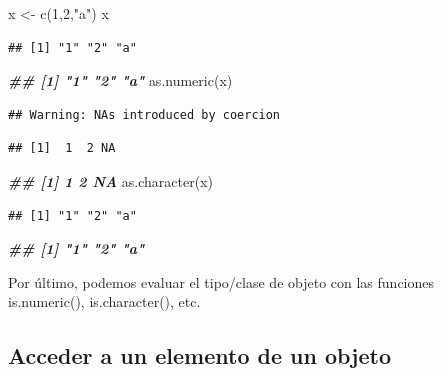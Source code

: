 \documentclass[
]{book}
\newenvironment{Shaded}{\begin{snugshade}}{\end{snugshade}}
\newcommand{\DecValTok}[1]{\textcolor[rgb]{0.00,0.00,0.81}{#1}}
\newcommand{\DocumentationTok}[1]{\textcolor[rgb]{0.56,0.35,0.01}{\textbf{\textit{#1}}}}
\newcommand{\FunctionTok}[1]{\textcolor[rgb]{0.00,0.00,0.00}{#1}}
\newcommand{\NormalTok}[1]{#1}
\newcommand{\OtherTok}[1]{\textcolor[rgb]{0.56,0.35,0.01}{#1}}
\newcommand{\StringTok}[1]{\textcolor[rgb]{0.31,0.60,0.02}{#1}}
\begin{document}
\begin{Shaded}
\begin{Highlighting}[]
\NormalTok{x }\OtherTok{\textless{}{-}} \FunctionTok{c}\NormalTok{(}\DecValTok{1}\NormalTok{,}\DecValTok{2}\NormalTok{,}\StringTok{"a"}\NormalTok{)}
\NormalTok{x}
\end{Highlighting}
\end{Shaded}

\begin{verbatim}
## [1] "1" "2" "a"
\end{verbatim}

\begin{Shaded}
\begin{Highlighting}[]
\DocumentationTok{\#\# [1] "1" "2" "a"}
\FunctionTok{as.numeric}\NormalTok{(x)}
\end{Highlighting}
\end{Shaded}

\begin{verbatim}
## Warning: NAs introduced by coercion
\end{verbatim}

\begin{verbatim}
## [1]  1  2 NA
\end{verbatim}

\begin{Shaded}
\begin{Highlighting}[]
\DocumentationTok{\#\# [1]  1  2 NA}
\FunctionTok{as.character}\NormalTok{(x)}
\end{Highlighting}
\end{Shaded}

\begin{verbatim}
## [1] "1" "2" "a"
\end{verbatim}

\begin{Shaded}
\begin{Highlighting}[]
\DocumentationTok{\#\# [1] "1" "2" "a"}
\end{Highlighting}
\end{Shaded}

Por último, podemos evaluar el tipo/clase de objeto con las funciones is.numeric(), is.character(), etc.

\hypertarget{acceder-a-un-elemento-de-un-objeto}{%
\subsection{Acceder a un elemento de un objeto}\label{acceder-a-un-elemento-de-un-objeto}}
\end{document}

